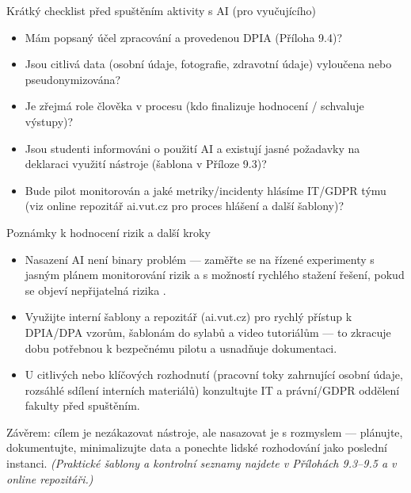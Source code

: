 Krátký checklist před spuštěním aktivity s AI (pro vyučujícího)
\begin{itemize}
  \item Mám popsaný účel zpracování a provedenou DPIA (Příloha 9.4)? \\
  \item Jsou citlivá data (osobní údaje, fotografie, zdravotní údaje) vyloučena nebo pseudonymizována? \\
  \item Je zřejmá role člověka v procesu (kdo finalizuje hodnocení / schvaluje výstupy)? \cite{kb_ai_101_tipu_pdf_04e4a115_page_8_1} \\
  \item Jsou studenti informováni o použití AI a existují jasné požadavky na deklaraci využití nástroje (šablona v Příloze 9.3)? \\
  \item Bude pilot monitorován a jaké metriky/incidenty hlásíme IT/GDPR týmu (viz online repozitář ai.vut.cz pro proces hlášení a další šablony)? 
\end{itemize}

Poznámky k hodnocení rizik a další kroky
\begin{itemize}
  \item Nasazení AI není binary problém — zaměřte se na řízené experimenty s jasným plánem monitorování rizik a s možností rychlého stažení řešení, pokud se objeví nepřijatelná rizika \cite{kb_malinka_chatgpt_ve_vyuce_dva_roky_pote_2024_pdf_90bc3aaf_page_12_1}.
  \item Využijte interní šablony a repozitář (ai.vut.cz) pro rychlý přístup k DPIA/DPA vzorům, šablonám do sylabů a video tutoriálům — to zkracuje dobu potřebnou k bezpečnému pilotu a usnadňuje dokumentaci.
  \item U citlivých nebo klíčových rozhodnutí (pracovní toky zahrnující osobní údaje, rozsáhlé sdílení interních materiálů) konzultujte IT a právní/GDPR oddělení fakulty před spuštěním.
\end{itemize}

Závěrem: cílem je nezákazovat nástroje, ale nasazovat je s rozmyslem — plánujte, dokumentujte, minimalizujte data a ponechte lidské rozhodování jako poslední instanci. \emph{(Praktické šablony a kontrolní seznamy najdete v Přílohách 9.3–9.5 a v online repozitáři.)}